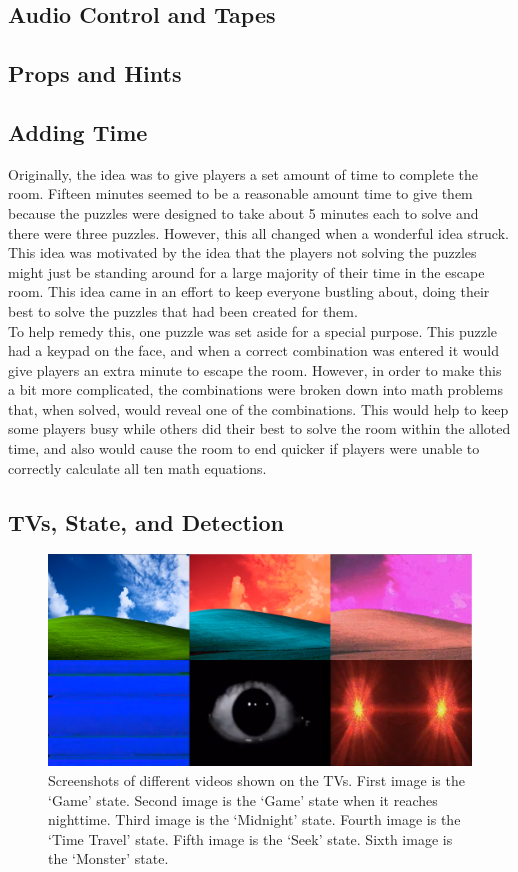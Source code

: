 \documentclass[conference]{IEEEtran}
\begin{document}
\subsection{Audio Control and Tapes} %

\subsection{Props and Hints} %

\subsection{Adding Time} %
Originally, the idea was to give players a set amount of time to complete the room. Fifteen minutes seemed to be a reasonable amount
time to give them because the puzzles were designed to take about 5 minutes each to solve and there were three puzzles. However,
this all changed when a wonderful idea struck. This idea was motivated by the idea that the players not solving the puzzles might
just be standing around for a large majority of their time in the escape room. This idea came in an effort to keep everyone bustling about, doing
their best to solve the puzzles that had been created for them.
\\
\indent To help remedy this, one puzzle was set aside for a special purpose. This puzzle had a keypad on the face, and when a correct combination was
entered it would give players an extra minute to escape the room. However, in order to make this a bit more complicated, the combinations were broken down
into math problems that, when solved, would reveal one of the combinations. This would help to keep some players busy while others did their best to solve
the room within the alloted time, and also would cause the room to end quicker if players were unable to correctly calculate all ten math equations.

\subsection{TVs, State, and Detection} %

\begin{figure}[ht]
    \centering
    \includegraphics[width=0.90\columnwidth]{Images/TV_States.png}
    \caption{Screenshots of different videos shown on the TVs. First image is the `Game' state.
    Second image is the `Game' state when it reaches nighttime. Third image is the `Midnight' state. 
    Fourth image is the `Time Travel' state. Fifth image is the `Seek' state. Sixth image is the `Monster' state.}
    \label{fig:tv}
\end{figure}
\end{document}
